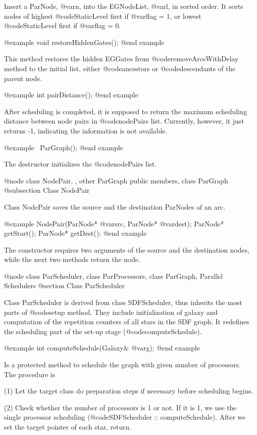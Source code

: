 Insert a ParNode, @var{n}, into the EGNodeList, @var{l}, in sorted order.
It sorts nodes of highest @code{StaticLevel} first if @var{flag} = 1,
or lowest @code{StaticLevel} first if @var{flag} = 0.

@example
void restoreHiddenGates();
@end example

This method restores the hidden EGGates from @code{removeArcsWithDelay} 
method to the initial list, either @code{ancestors} or @code{descendants}
of the parent node.

@example
int pairDistance();
@end example

After scheduling is completed, it is supposed to return the
maximum scheduling distance between node pairs in @code{nodePairs} list.
Currently, however, it just returns -1, indicating the information
is not available.

@example
~ParGraph();
@end example

The destructor initializes the @code{nodePairs} list.

@node class NodePair, , other ParGraph public members, class ParGraph
@subsection Class NodePair

Class NodePair saves the source and the destination ParNodes of an arc.

@example
NodePair(ParNode* @var{src}, ParNode* @var{dest});
ParNode* getStart();
ParNode* getDest();
@end example

The constructor requires two arguments of the source and the destination
nodes, while the next two methods return the node.

@node class ParScheduler, class ParProcessors, class ParGraph, Parallel Schedulers
@section Class ParScheduler

Class ParScheduler is derived from class SDFScheduler, thus inherits the most
parts of @code{setup} method. They include initialization of galaxy and
computation of the repetition counters of all stars in the SDF graph.
It redefines the scheduling part of the set-up stage (@code{computeSchedule}).

@example
int computeSchedule(Galaxy& @var{g});
@end example

Is a protected method to schedule the graph with given number of processors.
The procedure is

(1) Let the target class do preparation steps if necessary before scheduling
begins.

(2) Check whether the number of processors is 1 or not. If it is 1, we use
the single processor scheduling (@code{SDFScheduler :: computeSchedule}).
After we set the target pointer of each star, return.

